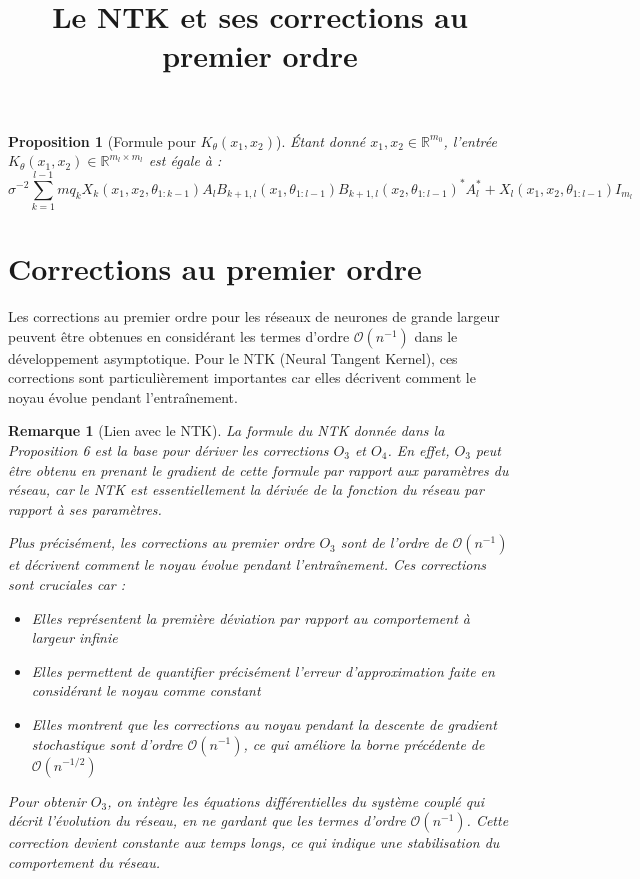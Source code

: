 \documentclass{article}
\title{Le NTK et ses corrections au premier ordre}
\author{}
\date{}
\newtheorem{proposition}{Proposition}
\newtheorem{remark}{Remarque}
\begin{document}
\maketitle

\begin{proposition}[Formule pour $K_\theta(x_1,x_2)$]
Étant donné $x_1,x_2 \in \mathbb{R}^{m_0}$, l'entrée $K_\theta(x_1,x_2) \in \mathbb{R}^{m_l \times m_l}$ est égale à :
\begin{equation}
\sigma^{-2} \sum_{k=1}^{l-1} m q_k X_k(x_1,x_2,\theta_{1:k-1})A_l B_{k+1,l}(x_1,\theta_{1:l-1})B_{k+1,l}(x_2,\theta_{1:l-1})^*A_l^* + X_l(x_1,x_2,\theta_{1:l-1})I_{m_l}
\end{equation}
\end{proposition}

\section{Corrections au premier ordre}

Les corrections au premier ordre pour les réseaux de neurones de grande largeur peuvent être obtenues en considérant les termes d'ordre $\mathcal{O}(n^{-1})$ dans le développement asymptotique. Pour le NTK (Neural Tangent Kernel), ces corrections sont particulièrement importantes car elles décrivent comment le noyau évolue pendant l'entraînement.

\begin{remark}[Lien avec le NTK]
La formule du NTK donnée dans la Proposition 6 est la base pour dériver les corrections $O_3$ et $O_4$. En effet, $O_3$ peut être obtenu en prenant le gradient de cette formule par rapport aux paramètres du réseau, car le NTK est essentiellement la dérivée de la fonction du réseau par rapport à ses paramètres.

Plus précisément, les corrections au premier ordre $O_3$ sont de l'ordre de $\mathcal{O}(n^{-1})$ et décrivent comment le noyau évolue pendant l'entraînement. Ces corrections sont cruciales car :
\begin{itemize}
\item Elles représentent la première déviation par rapport au comportement à largeur infinie
\item Elles permettent de quantifier précisément l'erreur d'approximation faite en considérant le noyau comme constant
\item Elles montrent que les corrections au noyau pendant la descente de gradient stochastique sont d'ordre $\mathcal{O}(n^{-1})$, ce qui améliore la borne précédente de $\mathcal{O}(n^{-1/2})$
\end{itemize}

Pour obtenir $O_3$, on intègre les équations différentielles du système couplé qui décrit l'évolution du réseau, en ne gardant que les termes d'ordre $\mathcal{O}(n^{-1})$. Cette correction devient constante aux temps longs, ce qui indique une stabilisation du comportement du réseau.
\end{remark}
\end{document}
